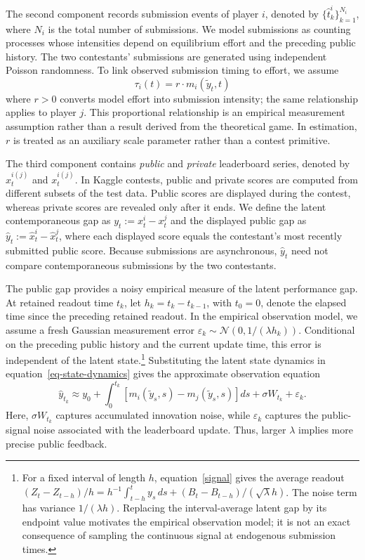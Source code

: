 \documentclass[mnsc]{informs3}
\begin{document}
The second component records submission events of player $i$, denoted by $\{\hat{t}^i_k\}_{k=1}^{N_i}$, where $N_i$ is the total number of submissions.
We model submissions as counting processes whose intensities depend on equilibrium effort and the preceding public history. The two contestants' submissions are generated using independent Poisson randomness. To link observed submission timing to effort, we assume
\begin{equation}\label{eq-model-intensity}
{\tau_i(t) = r \cdot m_i(\tilde{y}_t,t)}
\end{equation}
where \(r>0\) converts model effort into submission intensity; the same relationship applies to player \(j\). This proportional relationship is an empirical measurement assumption rather than a result derived from the theoretical game. In estimation, \(r\) is treated as an auxiliary scale parameter rather than a contest primitive.


The third component contains \textit{public} and \textit{private} leaderboard series, denoted by $\hat{x}^{i(j)}_t$ and $x^{i(j)}_t$.
In Kaggle contests, public and private scores are computed from different subsets of the test data. Public scores are displayed during the contest, whereas private scores are revealed only after it ends.
We define the latent contemporaneous gap as $y_t:=x_t^i-x_t^j$ and the displayed public gap as $\hat y_t:=\hat x_t^i-\hat x_t^j$, where each displayed score equals the contestant's most recently submitted public score. Because submissions are asynchronous, $\hat y_t$ need not compare contemporaneous submissions by the two contestants.

{The public gap provides a noisy empirical measure of the latent performance gap. {At retained readout time $t_k$, let $h_k=t_k-t_{k-1}$, with $t_0=0$, denote the elapsed time since the preceding retained readout.} In the empirical observation model, we assume a fresh Gaussian measurement error $\varepsilon_k\sim\mathcal N(0,1/(\lambda h_k))$. Conditional on the preceding public history and the current update time, this error is independent of the latent state.\footnote{{\color{black}For a fixed interval of length $h$, equation~\eqref{signal} gives the average readout $(Z_t-Z_{t-h})/h=h^{-1}\int_{t-h}^t y_s\,ds+(B_t-B_{t-h})/(\sqrt\lambda h)$. The noise term has variance $1/(\lambda h)$. Replacing the interval-average latent gap by its endpoint value motivates the empirical observation model; it is not an exact consequence of sampling the continuous signal at endogenous submission times.}} Substituting the latent state dynamics in equation~\eqref{eq-state-dynamics} gives the approximate observation equation}
\begin{equation}\label{eq-leaderboard-gap}
\hat y_{t_k}
\approx
{y_0+\int_0^{t_k}\left[m_i(\tilde{y}_s,s)-m_j(\tilde{y}_s,s)\right]ds}
+\sigma W_{t_k}
+\varepsilon_k.
\end{equation}
Here, $\sigma W_{t_k}$ captures accumulated innovation noise, while $\varepsilon_k$ captures the public-signal noise associated with the leaderboard update.
Thus, larger $\lambda$ implies more precise public feedback.
\end{document}
